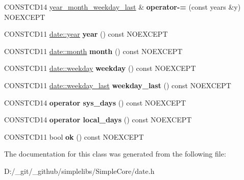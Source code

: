 \begin{DoxyCompactItemize}
\item 
\mbox{\label{classdate_1_1year__month__weekday__last_abc86c79f96d1930b1ced0aab68ea468b}} 
C\+O\+N\+S\+T\+C\+D14 \mbox{\hyperlink{classdate_1_1year__month__weekday__last}{year\+\_\+month\+\_\+weekday\+\_\+last}} \& {\bfseries operator-\/=} (const years \&y) N\+O\+E\+X\+C\+E\+PT
\item 
\mbox{\label{classdate_1_1year__month__weekday__last_ae487e3bc6d3af9c7e097b6d277178e32}} 
C\+O\+N\+S\+T\+C\+D11 \mbox{\hyperlink{classdate_1_1year}{date\+::year}} {\bfseries year} () const N\+O\+E\+X\+C\+E\+PT
\item 
\mbox{\label{classdate_1_1year__month__weekday__last_a8fb46528e17889f47816c0150b18a156}} 
C\+O\+N\+S\+T\+C\+D11 \mbox{\hyperlink{classdate_1_1month}{date\+::month}} {\bfseries month} () const N\+O\+E\+X\+C\+E\+PT
\item 
\mbox{\label{classdate_1_1year__month__weekday__last_a6491e4bb7f805ff816f8826b7198a256}} 
C\+O\+N\+S\+T\+C\+D11 \mbox{\hyperlink{classdate_1_1weekday}{date\+::weekday}} {\bfseries weekday} () const N\+O\+E\+X\+C\+E\+PT
\item 
\mbox{\label{classdate_1_1year__month__weekday__last_acad8d47b76e5cd57dfbeae8a6e727a4c}} 
C\+O\+N\+S\+T\+C\+D11 \mbox{\hyperlink{classdate_1_1weekday__last}{date\+::weekday\+\_\+last}} {\bfseries weekday\+\_\+last} () const N\+O\+E\+X\+C\+E\+PT
\item 
\mbox{\label{classdate_1_1year__month__weekday__last_a7c56c9fb1e69d3c4a84dc9988f40625d}} 
C\+O\+N\+S\+T\+C\+D14 {\bfseries operator sys\+\_\+days} () const N\+O\+E\+X\+C\+E\+PT
\item 
\mbox{\label{classdate_1_1year__month__weekday__last_aee29d96121750ffb8e20afccc9fd2774}} 
C\+O\+N\+S\+T\+C\+D14 {\bfseries operator local\+\_\+days} () const N\+O\+E\+X\+C\+E\+PT
\item 
\mbox{\label{classdate_1_1year__month__weekday__last_a19524f013798fcc5dbfc19b4f7282bb1}} 
C\+O\+N\+S\+T\+C\+D11 bool {\bfseries ok} () const N\+O\+E\+X\+C\+E\+PT
\end{DoxyCompactItemize}


The documentation for this class was generated from the following file\+:\begin{DoxyCompactItemize}
\item 
D\+:/\+\_\+git/\+\_\+github/simplelibs/\+Simple\+Core/date.\+h\end{DoxyCompactItemize}
